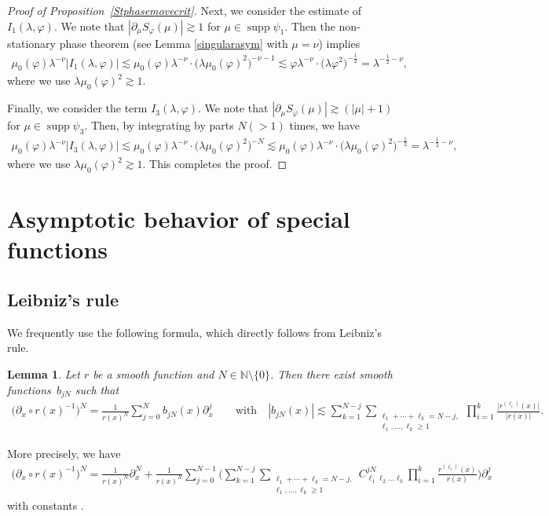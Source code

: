 \documentclass[11pt]{article}
\numberwithin{equation}{section}
\newtheorem{Lemma}[Theorem]{Lemma}
\DeclareMathOperator{\supp}{supp}%
\def\f{\varphi}
\def\g{\psi}
\def\l{\lambda}
\def\m{\mu}
\def\n{\nu}
\def\pa{\partial}
\begin{document}
\begin{proof}[Proof of Proposition~\ref{Stphasemovecrit}]
Next, we consider the estimate of $I_{1}(\l,\f)$. We note that $|\pa_{\m}S_{\f}(\m)|\gtrsim 1$ for $\m\in \supp \g_1$.
Then the non-stationary phase theorem (see Lemma \ref{singularasym} with $\m=\n$) implies
\begin{align*}
\m_0(\f)\l^{-\n}|I_1(\l,\f)|\lesssim \m_0(\f)\l^{-\n}\cdot \bigl(\l \m_0(\f)^2\bigr)^{-\n-1}\lesssim \f\l^{-\n}\cdot \bigl(\l \f^2\bigr)^{-\frac{1}{2}}=\l^{-\frac{1}{2}-\n},
\end{align*}
where we use $\l \m_0(\f)^2\gtrsim 1$.

Finally, we consider the term $I_{3}(\l,\f)$. We note that $|\pa_{\m}S_{\f}(\m)|\gtrsim (|\m|+1)$ for $\m\in \supp \g_3$. Then, by integrating by parts $N(>1)$ times, we have
\begin{align*}
\m_0(\f)\l^{-\n}|I_3(\l,\f)|\lesssim \m_0(\f)\l^{-\n}\cdot \bigl(\l \m_0(\f)^2\bigr)^{-N}\lesssim \m_0(\f)\l^{-\n}\cdot \bigl(\l \m_0(\f)^2\bigr)^{-\frac{1}{2}}=\l^{-\frac{1}{2}-\n},
\end{align*}
where we use $\l \m_0(\f)^2\gtrsim 1$. This completes the proof.
\end{proof}

\appendix\setcounter{section}{0}
\section{Asymptotic behavior of special functions}

\subsection{Leibniz's rule}

We frequently use the following formula, which directly follows from Leibniz's rule.

\begin{Lemma}\label{Leibnizrule}
Let $r$ be a smooth function and $N\in\mathbb{N}\setminus\{0\}$. Then there exist smooth functions~$b_{jN}$ such that
\begin{gather*}
\bigl(\pa_x\circ r(x)^{-1}\bigr)^N=\frac{1}{r(x)^N}\!\sum_{j=0}^Nb_{jN}(x)\pa_{x}^j\qquad \text{with}\quad |b_{jN}(x)|\lesssim \sum_{k=1}^{N-j}\sum_{\substack{\ell_1+\cdots+\ell_k=N-j,\\ \ell_1,\hdots,\ell_k\geq 1}}\prod_{i=1}^k\!\frac{\big|r^{(\ell_i)}(x)\big|}{|r(x)|}.
\end{gather*}
\end{Lemma}

\begin{Remark}
More precisely, we have
\begin{align*}
\bigl(\pa_x\circ r(x)^{-1}\bigr)^N=\frac{1}{r(x)^N}\pa_x^N+\frac{1}{r(x)^N}\sum_{j=0}^{N-1}\Bigg(\sum_{k=1}^{N-j}\sum_{\substack{\ell_1+\cdots+\ell_k=N-j,\\ \ell_1,\hdots,\ell_k\geq 1}}C_{\ell_1\ell_2\hdots \ell_k}^{jN}\prod_{i=1}^{k}\frac{r^{(\ell_i)}(x)}{r(x)} \Bigg)\pa_{x}^j
\end{align*}
with constants .
\end{Remark}
\end{document}
